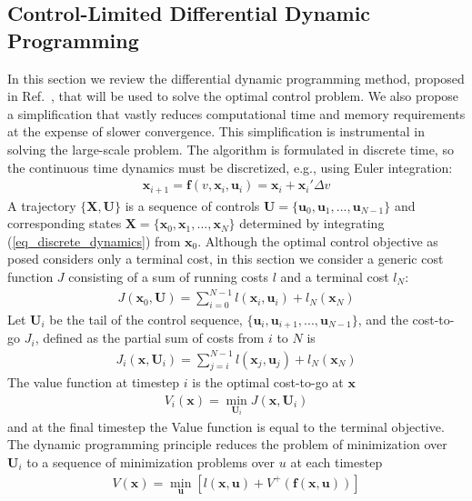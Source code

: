 \documentclass[journal ]{new-aiaa}
\newcommand{\state}{\ensuremath{\mathbf{x}}}
\newcommand{\control}{\ensuremath{\mathbf{u}}}
\newcommand{\State}{\ensuremath{\mathbf{X}}}
\newcommand{\Control}{\ensuremath{\mathbf{U}}}
\begin{document}
\subsection*{Control-Limited Differential Dynamic Programming}
In this section we review the differential dynamic programming method, proposed in Ref.~\cite{DDP_ControlLimited}, that will be used to solve the optimal control problem. We also propose a simplification that vastly reduces computational time and memory requirements at the expense of slower convergence. This simplification is instrumental in solving the large-scale problem.
The algorithm is formulated in discrete time, so the continuous time dynamics must be discretized, e.g., using Euler integration:
\begin{align}
\state_{i+1} = \mathbf{f}(v, \state_i,\control_i) = \state_i + \state_i'\Delta v \label{eq_discrete_dynamics}
\end{align}
A trajectory $\{\State,\Control\}$ is a sequence of controls $ \Control=\{\control_0,\control_1,...,\control_{N-1}\} $ and corresponding states $\State=\{\state_0,\state_1,...,\state_N\}$ determined by integrating (\ref{eq_discrete_dynamics}) from $\state_0$.
Although the optimal control objective as posed considers only a terminal cost, in this section we consider a generic cost function $J$ consisting of a sum of running costs $l$ and a terminal cost $l_N$:
\begin{align}
J(\state_0,\Control) = \sum_{i=0}^{N-1}l(\state_i,\control_i) + l_N(\state_N)
\end{align}
Let $\Control_i$ be the tail of the control sequence, $\{\control_i,\control_{i+1},...,\control_{N-1}\}$, and the cost-to-go $J_i$, defined as the partial sum of costs from $i$ to $N$ is
\begin{align}
J_i(\state,\Control_i) = \sum_{j=i}^{N-1}l(\state_j,\control_j) + l_N(\state_N)
\end{align}
The value function at timestep $i$ is the optimal cost-to-go at \state
\begin{align}
V_i(\state) = \min_{\Control_i} J(\state, \Control_i)
\end{align}
and at the final timestep the Value function is equal to the terminal objective. The dynamic programming principle reduces the problem of minimization over $\Control_i$ to a sequence of minimization problems over $u$ at each timestep 
\begin{align}
V(\state) = \min_{\control}\left[l(\state,\control) + V^+(\mathbf{f}(\state,\control))\right] \label{eq_dynamic_programming}
\end{align}
\end{document}
